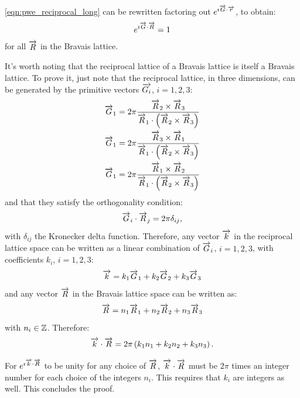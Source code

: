 \ref{eqn:pwe_reciprocal_long} can be rewritten factoring out
$e^{\imath {\overrightarrow{G} \cdot \overrightarrow{r}}}$, to obtain:
\begin{equation} \label{eqn:pwe_reciprocal}
  e^{\imath {\overrightarrow{G} \cdot \overrightarrow{R}}} = 1
\end{equation}
for all $\overrightarrow{R}$ in the Bravais lattice.

It's worth noting that the reciprocal lattice of a Bravais lattice is
itself a Bravais lattice. To prove it, just note that the reciprocal
lattice, in three dimensions, can be generated by the primitive
vectors $\overrightarrow{G_i}$, $i = 1,2,3$:
\begin{align*}
\overrightarrow{G}_1 & = 2 \pi \frac{{\overrightarrow{R}_2 \times \overrightarrow{R}_3}}{{\overrightarrow{R}_1 \cdot \left({\overrightarrow{R}_2 \times \overrightarrow{R}_3}\right)}} \\
\overrightarrow{G}_1 & = 2 \pi \frac{{\overrightarrow{R}_3 \times \overrightarrow{R}_1}}{{\overrightarrow{R}_1 \cdot \left({\overrightarrow{R}_2 \times \overrightarrow{R}_3}\right)}} \\
\overrightarrow{G}_1 & = 2 \pi \frac{{\overrightarrow{R}_1 \times \overrightarrow{R}_2}}{{\overrightarrow{R}_1 \cdot \left({\overrightarrow{R}_2 \times \overrightarrow{R}_3}\right)}}
\end{align*}
and that they satisfy the orthogonality condition:
\begin{equation*}
{\overrightarrow{G}_i \cdot \overrightarrow{R}_j} = 2 \pi \delta_{ij},
\end{equation*}
with $\delta_{ij}$ the Kronecker delta function. Therefore, any vector
$\overrightarrow{k}$ in the reciprocal lattice space can be written as a
linear combination of $\overrightarrow{G}_i$, $i = 1,2,3$, with coefficients
$k_i$, $i = 1,2,3$:
\begin{equation*}
  \overrightarrow{k} = k_1 \overrightarrow{G}_1 + k_2 \overrightarrow{G}_2 + k_3 \overrightarrow{G}_3
\end{equation*}
and any vector $\overrightarrow{R}$ in the Bravais lattice space can be
written as:
\begin{equation*}
\overrightarrow{R} = n_1 \overrightarrow{R}_1 + n_2 \overrightarrow{R}_2 + n_3 \overrightarrow{R}_3
\end{equation*}
with $n_i \in \mathbb{Z}$. Therefore:
\begin{equation*}
  {\overrightarrow{k} \cdot \overrightarrow{R}} = 2 \pi \left( k_1 n_1 + k_2 n_2 + k_3 n_3 \right).
\end{equation*}

For $e^{\imath {\overrightarrow{k} \cdot \overrightarrow{R}}}$ to be
unity for any choice of $\overrightarrow{R}$, ${\overrightarrow{k} \cdot \overrightarrow{R}}$ must be
$2 \pi$ times an integer number for each choice of the integers
$n_i$. This requires that $k_i$ are integers as well. This concludes
the proof. \CVD

